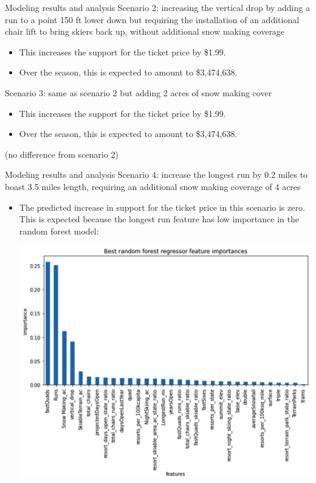 \documentclass{beamer}
\begin{document}
\begin{frame}{Modeling results and analysis}
Scenario 2: increasing the vertical drop by adding a run to a point 150 ft
lower down but requiring the installation of an additional chair lift to
bring skiers back up, without additional snow making coverage
\begin{itemize}
\item This increases the support for the ticket price by \$1.99.
\item Over the season, this is expected to amount to \$3,474,638.
\end{itemize}
Scenario 3: same as scenario 2 but adding 2 acres of snow making cover
\begin{itemize}
\item This increases the support for the ticket price by \$1.99.
\item Over the season, this is expected to amount to \$3,474,638.
\end{itemize}
(no difference from scenario 2)
\end{frame}

\begin{frame}{Modeling results and analysis}
Scenario 4: increase the longest run by 0.2 miles to boast 3.5 miles length,
requiring an additional snow making coverage of 4 acres
\begin{itemize}
\item 
The predicted increase in support for the ticket price in this scenario is zero.
This is expected because the longest run feature has low importance in the
random forest model:
\begin{center}
\includegraphics[scale=0.15]{bestrandomforestregressorfeatureimportances}
\end{center}
\end{itemize}
\end{frame}
\end{document}
